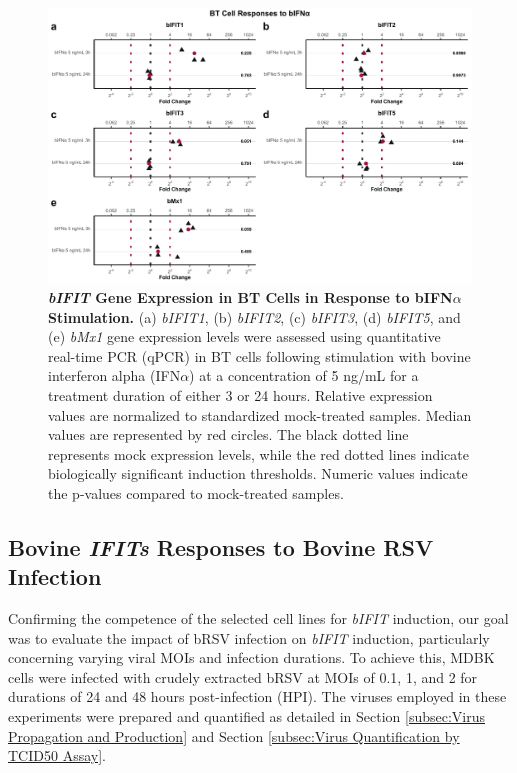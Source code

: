 \begin{figure}
    \centering
    \includegraphics[width=1\linewidth]{07. Chapter 2/Figs/02. Induction/08. bt_bifna.pdf}
    \caption[\textit{bIFIT} Gene Expression in BT Cells in Response to bIFN\(\alpha\) Stimulation.]{\textbf{\textit{bIFIT} Gene Expression in BT Cells in Response to bIFN\(\alpha\) Stimulation.} (a) \textit{bIFIT1}, (b) \textit{bIFIT2}, (c) \textit{bIFIT3}, (d) \textit{bIFIT5}, and (e) \textit{bMx1} gene expression levels were assessed using quantitative real-time PCR (qPCR) in BT cells following stimulation with bovine interferon alpha (IFN\(\alpha\)) at a concentration of 5 ng/mL for a treatment duration of either 3 or 24 hours. Relative expression values are normalized to standardized mock-treated samples. Median values are represented by red circles. The black dotted line represents mock expression levels, while the red dotted lines indicate biologically significant induction thresholds. Numeric values indicate the p-values compared to mock-treated samples.}
    \label{fig:BT responses to bifna}
\end{figure}

\subsection{Bovine \textit{IFITs} Responses to Bovine RSV Infection} \label{subsec:Bovine IFITs Responses to Bovine RSV Infection}
Confirming the competence of the selected cell lines for \textit{bIFIT} induction, our goal was to evaluate the impact of bRSV infection on \textit{bIFIT} induction, particularly concerning varying viral MOIs and infection durations. To achieve this, MDBK cells were infected with crudely extracted bRSV at MOIs of 0.1, 1, and 2 for durations of 24 and 48 hours post-infection (HPI). The viruses employed in these experiments were prepared and quantified as detailed in Section \ref{subsec:Virus Propagation and Production} and Section \ref{subsec:Virus Quantification by TCID50 Assay}.

